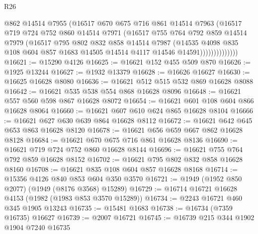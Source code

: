 \begin{lexlean}{R26}
\begin{coremodule}
                      @862
                      @14514
                      @7955
                      (@16517
                        @670
                        @675
                        @716
                        @861
                        @14514
                        @7963
                        (@16517
                          @719
                          @724
                          @752
                          @860
                          @14514
                          @7971
                          (@16517
                            @755
                            @764
                            @792
                            @859
                            @14514
                            @7979
                            (@16517
                              @795
                              @802
                              @832
                              @858
                              @14514
                              @7987
                              (@14535
                                @4098
                                @835
                                @108
                                @604
                                @857
                                @1683
                                @14505
                                @14514
                                @4117
                                @14546
                                @14591))))))))))))))
@16621 := @15290 @4126
@16625 := @16621 @152 @455 @509 @870
@16626 := @1925 @13244
@16627 := @1932 @13379
@16628 := @16626 @16627
@16630 := @16625 @16628 @8080
@16636 := @16621 @512 @515 @532 @869 @16628 @8088
@16642 := @16621 @535 @538 @554 @868 @16628 @8096
@16648 := @16621 @557 @560 @598 @867 @16628 @8072
@16654 := @16621 @601 @108 @604 @866 @16628 @8064
@16660 := @16621 @607 @610 @624 @865 @16628 @8104
@16666 := @16621 @627 @630 @639 @864 @16628 @8112
@16672 := @16621 @642 @645 @653 @863 @16628 @8120
@16678 := @16621 @656 @659 @667 @862 @16628 @8128
@16684 := @16621 @670 @675 @716 @861 @16628 @8136
@16690 := @16621 @719 @724 @752 @860 @16628 @8144
@16696 := @16621 @755 @764 @792 @859 @16628 @8152
@16702 := @16621 @795 @802 @832 @858 @16628 @8160
@16708 := @16621 @835 @108 @604 @857 @16628 @8168
@16714 := @15356 @4126 @840 @853 @604 @350 @3570
@16721 := @1949 (@1952 @850 @2077) (@1949 (@8176 @3568) @15289)
@16729 := @16714 @16721 @16628 @4153 (@1982 (@1983 @853 @3570 @15289))
@16734 := @2243 @16721 @460 @345 @1905 @13243
@16735 := @15481 @1683
@16738 := @16734 (@7359 @16735) @16627
@16739 := @2007 @16721
@16745 := @16739 @215 @344 @1902 @1904 @7240 @16735

\end{coremodule}
\end{lexlean}
